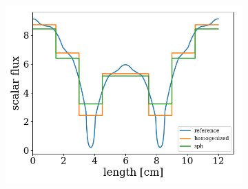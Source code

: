\documentclass[fleqn]{beamer}
\begin{document}
\begin{frame}
\begin{figure}[htb]
\begin{subfigure}{0.5\textwidth}
                \includegraphics[totalheight=0.5\textheight]{figures/scalar_flux_assay1}
                \label{fig:XS_U238}
            \end{subfigure}%
        \end{figure}
    \end{frame}
\end{document}
